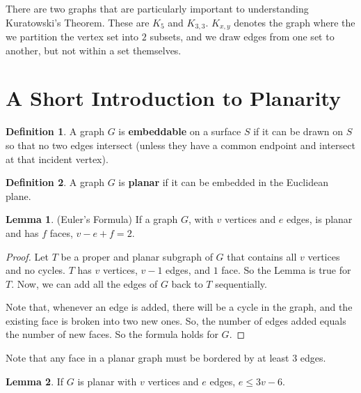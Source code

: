 \documentclass[12pt]{article}
\theoremstyle{definition}
\newtheorem{defn}{Definition}[section]
\newtheorem{lem}{Lemma}[section]
\begin{document}
There are two graphs that are particularly important to understanding Kuratowski's Theorem. These are $K_5$ and $K_{3,3}$. $K_{x,y}$ denotes the graph where the we partition the vertex set into $2$ subsets, and we draw edges from one set to another, but not within a set themselves.

\section{A Short Introduction to Planarity}
\begin{bluebox}
    \begin{defn}
        A graph $G$ is \textbf{embeddable} on a surface $S$ if it can be drawn on $S$ so that no two edges intersect (unless they have a common endpoint and intersect at that incident vertex).
    \end{defn}
\end{bluebox}

\begin{bluebox}
    \begin{defn}
        A graph $G$ is \textbf{planar} if it can be embedded in the Euclidean plane.
    \end{defn}
\end{bluebox}

\begin{greenbox}
\begin{lem}(Euler's Formula)
    If a graph $G$, with $v$ vertices and $e$ edges, is planar and has $f$ faces, $v-e + f = 2$.
\end{lem}
\end{greenbox}

\begin{proof}
    Let $T$ be a proper and planar subgraph of $G$ that contains all $v$ vertices and no cycles. $T$ has $v$ vertices, $v - 1$ edges, and $1$ face. So the Lemma is true for $T$. Now, we can add all the edges of $G$ back to $T$ sequentially.

    Note that, whenever an edge is added, there will be a cycle in the graph, and the existing face is broken into two new ones. So, the number of edges added equals the number of new faces.
    So the formula holds for $G$.
\end{proof}

    \noindent Note that any face in a planar graph must be bordered by at least $3$ edges.

\begin{greenbox}
\begin{lem}
    If $G$ is planar with $v$ vertices and $e$ edges, $e \le 3v -6$.
\end{lem}
\end{greenbox}
\end{document}
